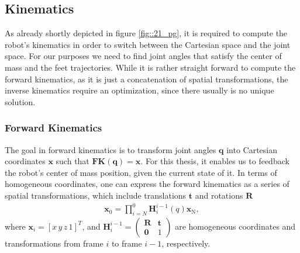 \subsection{Kinematics}
\label{sec::214_k}
As already shortly depicted in figure \ref{fig::21_pg}, it is required to compute the robot's kinematics in order to switch between the Cartesian space and the joint space. For our purposes we need to find joint angles that satisfy the center of mass and the feet trajectories. While it is rather straight forward to compute the forward kinematics, as it is just a concatenation of spatial transformations, the inverse kinematics require an optimization, since there usually is no unique solution.
\subsubsection{Forward Kinematics}
\label{sec::2141_fk}
The goal in forward kinematics is to transform joint angles $\bm{q}$ into Cartesian coordinates $\bm{x}$ such that $\textbf{FK}(\bm{q}) = \bm{x}$. For this thesis, it enables us to feedback the robot's center of mass position, given the current state of it. In terms of homogeneous coordinates, one can express the forward kinematics as a series of spatial transformations, which include translations $\bm{t}$ and rotations $\bm{R}$ 
\begin{align}
	\bm{x}_\text{0} = \prod_{i=N}^{0}\bm{H}_i^{i-1}(q)\bm{x}_\text{N},
\end{align}
where $\bm{x}_i=[x\,y\,z\,1]^T$, and $\bm{H}_i^{i-1}=\begin{pmatrix}\bm{R} & \bm{t} \\ \bm{0} & 1 \end{pmatrix}$ are homogeneous coordinates and transformations from frame $i$ to frame $i-1$, respectively.
